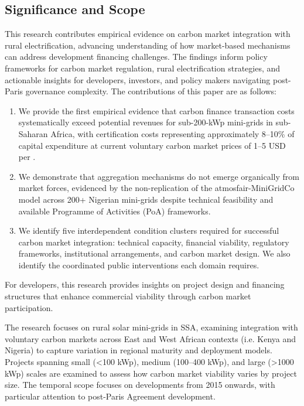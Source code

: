 \subsection{Significance and Scope}
\label{subsec:scope}
This research contributes empirical evidence on carbon market integration with rural electrification, advancing understanding of how market-based mechanisms can address development financing challenges. The findings inform policy frameworks for carbon market regulation, rural electrification strategies, and actionable insights for developers, investors, and policy makers navigating post-Paris governance complexity. The contributions of this paper are as follows:
\begin{enumerate}
    \item We provide the first empirical evidence that carbon finance transaction costs systematically exceed potential revenues for sub-200-kWp mini-grids in sub-Saharan Africa, with certification costs representing approximately 8--10\% of capital expenditure at current voluntary carbon market prices of 1--5 USD per \tcooe.
    \item We demonstrate that aggregation mechanisms do not emerge organically from market forces, evidenced by the non-replication of the atmosfair-MiniGridCo model across 200+ Nigerian mini-grids despite technical feasibility and available Programme of Activities (PoA) frameworks.
    \item We identify five interdependent condition clusters required for successful carbon market integration: technical capacity, financial viability, regulatory frameworks, institutional arrangements, and carbon market design. We also identify the coordinated public interventions each domain requires.
\end{enumerate}
For developers, this research provides insights on project design and financing structures that enhance commercial viability through carbon market participation.

The research focuses on rural solar mini-grids in SSA, examining integration with voluntary carbon markets across East and West African contexts (i.e. Kenya and Nigeria) to capture variation in regional maturity and deployment models. Projects spanning small (<100 kWp), medium (100–400 kWp), and large (>1000 kWp) scales are examined to assess how carbon market viability varies by project size. The temporal scope focuses on developments from 2015 onwards, with particular attention to post-Paris Agreement development.

